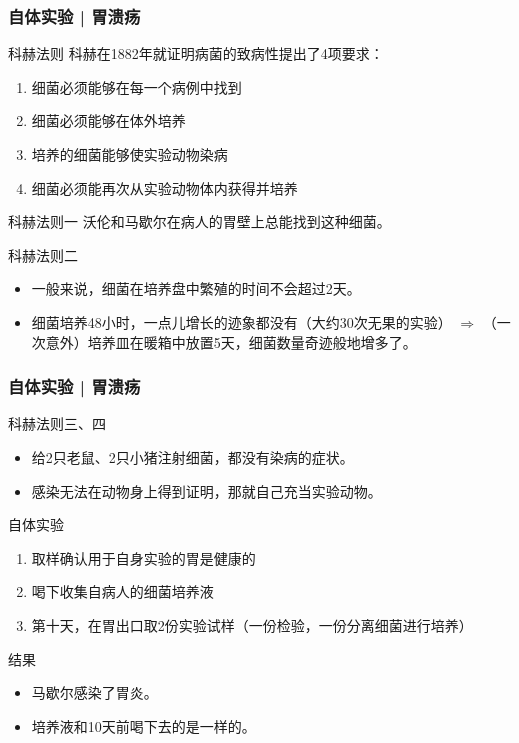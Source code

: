 \begin{frame}
  \frametitle{自体实验 | 胃溃疡}
  \begin{block}{科赫法则}
    科赫在1882年就证明病菌的致病性提出了4项要求：
    \begin{enumerate}
      \item 细菌必须能够在每一个病例中找到
      \item 细菌必须能够在体外培养
      \item 培养的细菌能够使实验动物染病
      \item 细菌必须能再次从实验动物体内获得并培养
    \end{enumerate}
  \end{block}
  \vspace{-0.5em}
  \pause
  \begin{block}{科赫法则一}
    沃伦和马歇尔在病人的胃壁上总能找到这种细菌。
  \end{block}
  \vspace{-0.5em}
  \pause
  \begin{block}{科赫法则二}
    \begin{itemize}
      \item 一般来说，细菌在培养盘中繁殖的时间不会超过2天。
      \item 细菌培养48小时，一点儿增长的迹象都没有（大约30次无果的实验） $\Longrightarrow$ （一次意外）培养皿在暖箱中放置5天，细菌数量奇迹般地增多了。
    \end{itemize}
  \end{block}
\end{frame}

\begin{frame}
  \frametitle{自体实验 | 胃溃疡}
  \begin{block}{科赫法则三、四}
    \begin{itemize}
      \item 给2只老鼠、2只小猪注射细菌，都没有染病的症状。
      \item 感染无法在动物身上得到证明，那就自己充当实验动物。
    \end{itemize}
  \end{block}
  \pause
  \begin{block}{自体实验}
    \begin{enumerate}
      \item 取样确认用于自身实验的胃是健康的
      \item 喝下收集自病人的细菌培养液
      \item 第十天，在胃出口取2份实验试样（一份检验，一份分离细菌进行培养）
    \end{enumerate}
  \end{block}
  \pause
  \begin{block}{结果}
    \begin{itemize}
      \item 马歇尔感染了胃炎。
      \item 培养液和10天前喝下去的是一样的。
    \end{itemize}
  \end{block}
\end{frame}

